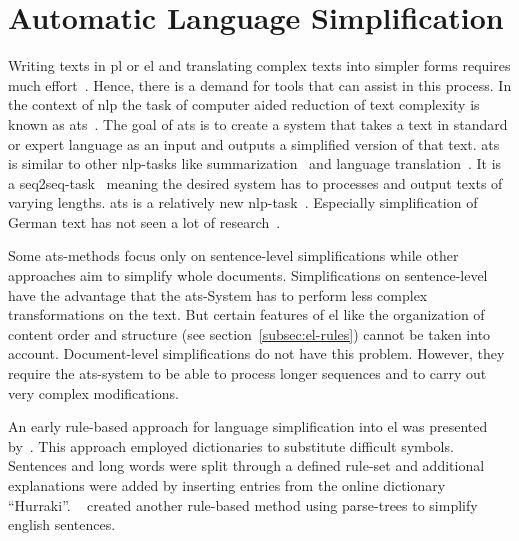 \section{Automatic Language Simplification}\label{sec:langSimp}

Writing texts in \gls{pl} or \gls{el} and translating complex texts into simpler forms requires much effort~\autocite{easyLanguageBook}.
Hence, there is a demand for tools that can assist in this process.
In the context of \gls{nlp} the task of computer aided reduction of text complexity is known as \gls{ats}~\autocite{Ansch_tz_2023}.
The goal of \gls{ats} is to create a system that takes a text in standard or expert language as an input and outputs a simplified version of that text.
\gls{ats} is similar to other \gls{nlp}-tasks like summarization~\autocite{rios-etal-2021-new} and language translation~\autocite{aumiller2022klexikon}.
It is a \gls{seq2seq}-task~\autocite{Ansch_tz_2023} meaning the desired system has to processes and output texts of varying lengths.
\gls{ats} is a relatively new \gls{nlp}-task~\autocite{schomacker2023data}.
Especially simplification of German text has not seen a lot of research~\autocite{Ansch_tz_2023}.

Some \gls{ats}-methods focus only on sentence-level simplifications while other approaches aim to simplify whole documents.
Simplifications on sentence-level have the advantage that the \gls{ats}-System has to perform less complex transformations on the text.
But certain features of \gls{el} like the organization of content order and structure (see section~\ref{subsec:el-rules}) cannot be taken into account. %
Document-level simplifications do not have this problem.
However, they require the \gls{ats}-system to be able to process longer sequences and to carry out very complex modifications.

An early rule-based approach for language simplification into \gls{el} was presented by~\autocite{suter2016}.
This approach employed dictionaries to substitute difficult symbols.
Sentences and long words were split through a defined rule-set and additional explanations were added by inserting entries from the online dictionary \enquote{Hurraki}.
~\autocite{Garain2019} created another rule-based method using parse-trees to simplify english sentences.

